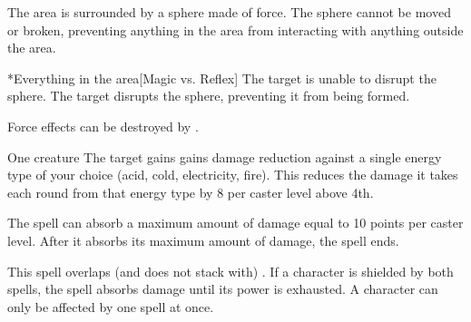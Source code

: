 \begin{spellheader}
    \spellrng{\rngmed}
    \spelldur{\durshort \dismissable}
\end{spellheader}
\begin{spelleffects}
    \spellline
    \spelleffect The area is surrounded by a sphere made of force. The sphere cannot be moved or broken, preventing anything in the area from interacting with anything outside the area.
    \begin{spelltarget}*{Everything in the area}[Magic vs. Reflex]
        \spellsuccess The target is unable to disrupt the sphere.
        \spellfailure The target disrupts the sphere, preventing it from being formed.
    \end{spelltarget}
\end{spelleffects}
\begin{spellfooter}
    \spellnotes Force effects can be destroyed by .
\end{spellfooter}

\begin{spellheader}
\end{spellheader}
\begin{spelleffects}
    \begin{spelltarget}{One creature}
        \spelleffect The target gains gains damage reduction against a single energy type of your choice (acid, cold, electricity, fire). This reduces the damage it takes each round from that energy type by 8  per caster level above 4th.
        \par The spell can absorb a maximum amount of damage equal to 10 points per caster level. After it absorbs its maximum amount of damage, the spell ends.
    \end{spelltarget}
\end{spelleffects}
\begin{spellfooter}
    \spellnotes This spell overlaps (and does not stack with) . If a character is shielded by both spells, the  spell absorbs damage until its power is exhausted. A character can only be affected by one  spell at once.
\end{spellfooter}

